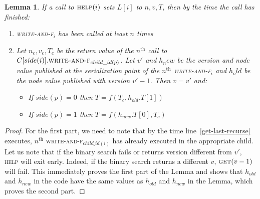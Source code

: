 \documentclass[a4paper,11pt]{article}
\newtheorem{lemma}{Lemma}
\newcommand{\fn}[1]{\textsc{#1}}
\begin{document}
\begin{lemma}
	If a call to $\fn{help}(i)$ sets $L[i]$ to $n, v, T$, then by the time the call has finished: \label{last-is-correct}
\begin{enumerate}
	\item \fn{write-and-f$_i$} has been called at least $n$ times
	\item Let $n_c, v_c, T_c$ be the return value of the $n^{\text{th}}$ call to $C[side(i)].\fn{write-and-f}_{child\_id(p)}$. Let $v'$ and $h_new$ be the version and node value published at the serialization point of the $n^{\text{th}}$
		\fn{write-and-f$_i$} and $h_old$ be the node value published with version $v'-1$. Then $v = v'$ and:
		\begin{itemize}
			\item If $side(p) = 0$ then $T = f(T_c, h_{old}.T[1])$
			\item If $side(p) = 1$ then $T = f(h_{new}.T[0], T_c)$
		\end{itemize}
\end{enumerate}
\end{lemma}
\begin{proof}
	For the first part, we need to note that by the time line~\ref{get-last-recurse} executes, $n^{\text{th}}$ \fn{write-and-f$_{child\_id(i)}$} has already executed in the appropriate child.
	Let us note that if the binary search fails or returns version different from $v'$, \fn{help} will exit early. Indeed, if the binary search returns a different $v$, $\fn{get}(v-1)$ will fail.
	This immediately proves the first part of the Lemma and shows that $h_{old}$ and $h_{new}$ in the code have the same values as $h_{old}$ and $h_{new}$ in the Lemma, which proves the second part.
\end{proof}
\end{document}
